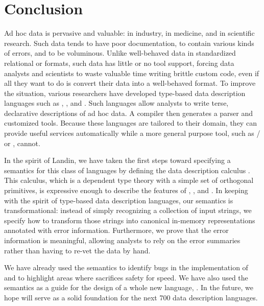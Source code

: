 \section{Conclusion} 
\label{sec:conclusion}

Ad hoc data is pervasive and valuable: in industry, in medicine, and
in scientific research.  Such data tends to have poor documentation,
to contain various kinds of errors, and to be voluminous.  Unlike
well-behaved data in standardized relational or \xml{} formats, such
data has little or no tool support, forcing data analysts and
scientists to waste valuable time writing brittle custom code, even if
all they want to do is convert their data into a well-behaved format.
To improve the situation, various researchers have developed type-based data
description languages such as \pads{}, \datascript{}, and
\packettypes{}.  Such languages allow analysts to write terse,
declarative descriptions of ad hoc data.  A compiler then generates a
parser and customized tools.  Because these languages are tailored to
their domain, they can provide useful services automatically while a
more general purpose tool, such as \lex{}/\yacc{} or \perl{}, cannot.

In the spirit of Landin, we have taken the first steps toward
specifying a semantics for this class of languages by defining the
data description calculus \ddc{}.  This calculus, which is a dependent
type theory with a simple set of orthogonal primitives, is expressive
enough to describe the features of \pads{}, \datascript{}, and
\packettypes{}.  In keeping with the spirit of type-based data description
languages, our semantics is transformational: instead of simply
recognizing a collection of input strings, we specify how to transform
those strings into canonical in-memory representations annotated with
error information.  Furthermore, we prove that the error information
is meaningful, allowing analysts to rely on the error summaries rather
than having to re-vet the data by hand.

We have already used the semantics to identify bugs in the
implementation of \padsc{} and to highlight areas where \padsc{}
sacrifices safety for speed.  We have also used the semantics as a guide
for the design of a whole new language, \padsml{}.  In the future, we hope 
\ddc{} will serve as a solid foundation for the next 700 data 
description languages.
